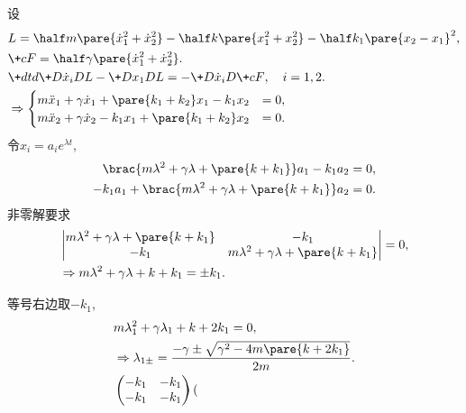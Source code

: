 \documentclass{ctexart}
\begin{document}
\begin{sample}
    \begin{ex}
        设
        \begin{align*}
            & L = \half m\pare{\dot{x}_1^2 + \dot{x}_2^2} - \half k\pare{x_1^2 + x_2^2} - \half k_1 \pare{x_2-x_1}^2, \\
            & \+cF = \half \gamma\pare{\dot{x}_1^2 + \dot{x}_2^2}. \\
            & \+dtd{} \+D{\dot{x}_i}DL - \+D{x_1}DL = -\+D{\dot{x}_i}D{\+cF},\quad i=1,2. \\
            & \Rightarrow \begin{cases}
                m\ddot{x}_1 + \gamma\dot{x}_1 + \pare{k_1+k_2}x_1 - k_1 x_2 &= 0, \\
                m\ddot{x}_2 + \gamma\dot{x}_2 - k_1x_1 + \pare{k_1+k_2}x_2 &= 0.
            \end{cases}
        \end{align*}
        令$x_i = a_ie^{\lambda t}$,
        \begin{align*}
            \brac{m\lambda^2 + \gamma\lambda + \pare{k+k_1}}a_1 - k_1 a_2 &= 0, \\
            -k_1a_1 + \brac{m\lambda^2 + \gamma\lambda + \pare{k+k_1}} a_2 &= 0.
        \end{align*}
        非零解要求
        \begin{align*}
            & \begin{vmatrix}
                m\lambda^2 + \gamma\lambda + \pare{k+k_1} & -k_1 \\
                -k_1 & m\lambda^2 + \gamma\lambda + \pare{k+k_1}
            \end{vmatrix} = 0, \\
            & \Rightarrow m\lambda^2 + \gamma\lambda + k + k_1 = \pm k_1.
        \end{align*}
        \begin{cenum}
            \item 等号右边取$-k_1$,
            \begin{align*}
                & m\lambda_1^2 + \gamma\lambda_1 + k + 2k_1 = 0, \\
                & \Rightarrow \lambda_{1\pm} = \frac{-\gamma \pm \sqrt{\gamma^2 - 4m\pare{k+2k_1}}}{2m}. \\
                & \begin{pmatrix}
                    -k_1 & -k_1 \\
                    -k_1 & -k_1
                \end{pmatrix}\begin{pmatrix}

\end{pmatrix}
\end{align*}
\end{cenum}
\end{ex}
\end{sample}
\end{document}
